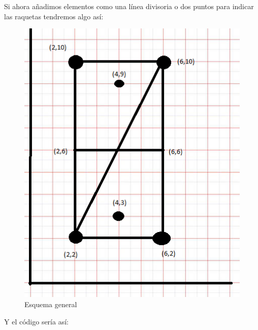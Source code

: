 \documentclass[a4paper,12pt,spanish]{sphinxmanual}
\begin{document}
Si ahora añadimos elementos como una línea divisoria o dos puntos para indicar las raquetas tendremos algo así:
\begin{figure}[htbp]
\centering
\capstart

\includegraphics{esquemajuego.png}
\caption{Esquema general}\end{figure}

Y el código sería así:
\end{document}
